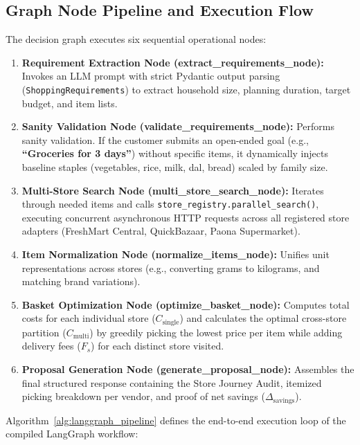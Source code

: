 \subsection{Graph Node Pipeline and Execution Flow}
The decision graph executes six sequential operational nodes:
\begin{enumerate}
    \item \textbf{Requirement Extraction Node (extract\_requirements\_node):} Invokes an LLM prompt with strict Pydantic output parsing (\texttt{ShoppingRequirements}) to extract household size, planning duration, target budget, and item lists.
    \item \textbf{Sanity Validation Node (validate\_requirements\_node):} Performs sanity validation. If the customer submits an open-ended goal (e.g., \textbf{``Groceries for 3 days''}) without specific items, it dynamically injects baseline staples (vegetables, rice, milk, dal, bread) scaled by family size.
    \item \textbf{Multi-Store Search Node (multi\_store\_search\_node):} Iterates through needed items and calls \texttt{store\_registry.parallel\_search()}, executing concurrent asynchronous HTTP requests across all registered store adapters (FreshMart Central, QuickBazaar, Paona Supermarket).
    \item \textbf{Item Normalization Node (normalize\_items\_node):} Unifies unit representations across stores (e.g., converting grams to kilograms, and matching brand variations).
    \item \textbf{Basket Optimization Node (optimize\_basket\_node):} Computes total costs for each individual store ($C_{\text{single}}$) and calculates the optimal cross-store partition ($C_{\text{multi}}$) by greedily picking the lowest price per item while adding delivery fees ($F_s$) for each distinct store visited.
    \item \textbf{Proposal Generation Node (generate\_proposal\_node):} Assembles the final structured response containing the Store Journey Audit, itemized picking breakdown per vendor, and proof of net savings ($\Delta_{\text{savings}}$).
\end{enumerate}

Algorithm~\ref{alg:langgraph_pipeline} defines the end-to-end execution loop of the compiled LangGraph workflow:


